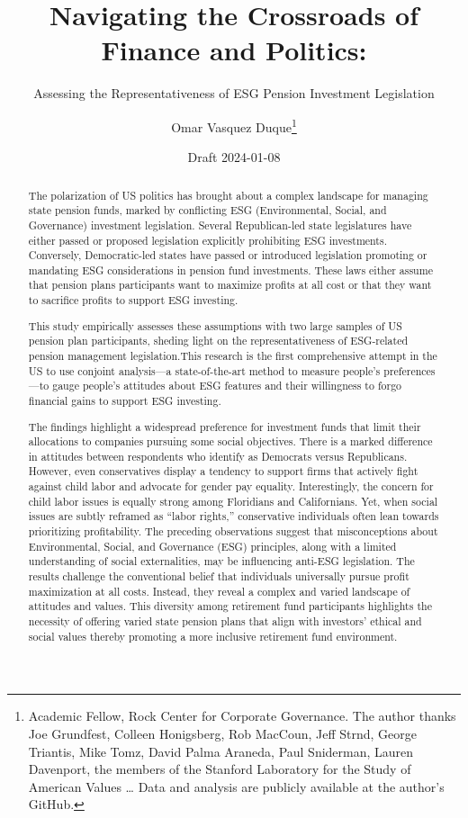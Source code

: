 \documentclass[
  12pt,
]{article}
\title{Navigating the Crossroads of Finance and Politics:}
\subtitle{Assessing the Representativeness of ESG Pension Investment Legislation}
\author{Omar Vasquez Duque\footnote{Academic Fellow, Rock Center for Corporate Governance. The author thanks Joe Grundfest, Colleen Honigsberg, Rob MacCoun, Jeff Strnd, George Triantis, Mike Tomz, David Palma Araneda, Paul Sniderman, Lauren Davenport, the members of the Stanford Laboratory for the Study of American Values \ldots{} Data and analysis are publicly available at the author's GitHub.}}
\date{Draft 2024-01-08}
\begin{document}
\maketitle
\begin{abstract}
\fontsize{11pt}{12pt}\selectfont

The polarization of US politics has brought about a complex landscape for managing state pension funds, marked by conflicting ESG (Environmental, Social, and Governance) investment legislation. Several Republican-led state legislatures have either passed or proposed legislation explicitly prohibiting ESG investments. Conversely, Democratic-led states have passed or introduced legislation promoting or mandating ESG considerations in pension fund investments. These laws either assume that pension plans participants want to maximize profits at all cost or that they want to sacrifice profits to support ESG investing.

This study empirically assesses these assumptions with two large samples of US pension plan participants, sheding light on the representativeness of ESG-related pension management legislation.This research is the first comprehensive attempt in the US to use conjoint analysis---a state-of-the-art method to measure people's preferences---to gauge people's attitudes about ESG features and their willingness to forgo financial gains to support ESG investing.

The findings highlight a widespread preference for investment funds that limit their allocations to companies pursuing some social objectives. There is a marked difference in attitudes between respondents who identify as Democrats versus Republicans. However, even conservatives display a tendency to support firms that actively fight against child labor and advocate for gender pay equality. Interestingly, the concern for child labor issues is equally strong among Floridians and Californians. Yet, when social issues are subtly reframed as ``labor rights,'' conservative individuals often lean towards prioritizing profitability. The preceding observations suggest that misconceptions about Environmental, Social, and Governance (ESG) principles, along with a limited understanding of social externalities, may be influencing anti-ESG legislation. The results challenge the conventional belief that individuals universally pursue profit maximization at all costs. Instead, they reveal a complex and varied landscape of attitudes and values. This diversity among retirement fund participants highlights the necessity of offering varied state pension plans that align with investors' ethical and social values thereby promoting a more inclusive retirement fund environment.
\end{abstract}
\end{document}
